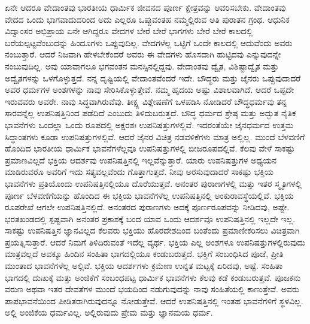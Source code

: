 ಏನೇ ಆದರೂ ವೇದಾಂತವು ಭಾರತೀಯ ಧಾರ್ಮಿಕ ಜೀವನದ ಪೂರ್ಣ ಕ್ಷೇತ್ರವನ್ನು ಆವರಿಸಬೇಕು. ವೇದಾಂತವು ವೇದದ ಒಂದು ಭಾಗವಾದುದರಿಂದ ಅದು ಎಲ್ಲರೂ ಒಪ್ಪುವಂತಹ ನಮ್ಮಲ್ಲಿರುವ ಅತಿ ಪುರಾತನ ಗ್ರಂಥ. ಆಧುನಿಕ ವಿದ್ವಾಂಸರ ಅಭಿಪ್ರಾಯ ಏನೇ ಆಗಿದ್ದರೂ ವೇದಗಳ ಬೇರೆ ಬೇರೆ ಭಾಗಗಳು ಬೇರೆ ಬೇರೆ ಕಾಲದಲ್ಲಿ ಬರೆಯಲ್ಪಟ್ಟವೆಂಬುದನ್ನು ಹಿಂದೂಗಳು ಒಪ್ಪುವುದಿಲ್ಲ. ವೇದಗಳೆಲ್ಲ ಒಟ್ಟಿಗೆ ಒಂದೇ ಕಾಲದಲ್ಲಿ ಆದುವೆಂದು ಅವರು ನಂಬುತ್ತಾರೆ. ಆದರೆ ನಿಜವಾಗಿ ಹೇಳಬೇಕೆಂದರೆ ಅವರು ಈ ವೇದಗಳು ಹೊಸದಾಗಿ ಹುಟ್ಟಿದವು ಎನ್ನುವುದನ್ನೇ ನಂಬುವುದಿಲ್ಲ. ಅವು ಯಾವಾಗಲೂ ಭಗವಂತನ ಮನಸ್ಸಿ\-ನಲ್ಲಿದ್ದವು. ವೇದಾಂತವು ದ್ವೈತ, ವಿಶಿಷ್ಟಾದ್ವೈತ ಮತ್ತು ಅದ್ವೈತಗಳನ್ನು ಒಳಗೊಳ್ಳುತ್ತದೆ. ನನ್ನ ದೃಷ್ಟಿಯಲ್ಲಿ ವೇದಾಂತವೆಂದರೆ ಇದೇ. ಬೌದ್ಧರು ಮತ್ತು ಜೈನರು ಒಪ್ಪುವುದಾದರೆ ಅವರ ಧರ್ಮಗಳ ಅಂಶಗಳನ್ನು ನಾವು ಸೇರಿಸಿಕೊಳ್ಳುತ್ತೇವೆ. ನಮ್ಮ ಹೃದಯ ಅಷ್ಟು ವಿಶಾಲವಾಗಿದೆ. ಆದರೆ ಒಪ್ಪದೇ ಇರುವವರು ಅವರೇ. ನಾವು ಸಿದ್ಧವಾಗಿರುವೆವು. ತೀಕ್ಷ್ಣ ವಿಶ್ಲೇಷಣೆಗೆ ಒಳಪಡಿಸಿ ನೋಡಿದರೆ ಬೌದ್ಧಧರ್ಮವು ತನ್ನ ಸಾರವನ್ನೆಲ್ಲ ಉಪನಿಷತ್ತಿನಿಂದ ಪಡೆದಿದೆ ಎಂಬುದು ತಿಳಿದುಬರುತ್ತದೆ. ಬೌದ್ಧ ಧರ್ಮದ ಶ್ರೇಷ್ಠ ಮತ್ತು ಅದ್ಭುತ ನೈತಿಕ ಭಾವನೆಗಳು ಒಂದಲ್ಲಾ ಒಂದು ರೂಪದಲ್ಲಿ ಅಕ್ಷರಶಃ ಉಪನಿಷತ್ತುಗಳಲ್ಲಿವೆ. ಇದರಂತೆಯೇ ಜೈನಧರ್ಮದ ಉತ್ತಮ ಸಿದ್ಧಾಂತಗಳು ಕೂಡಾ ಉಪನಿಷತ್ತುಗಳಲ್ಲಿವೆ. ಆದರೆ ಜೈನರ ವಿಚಿತ್ರ ನಡವಳಿಕೆಗಳು ಮಾತ್ರ ಅಲ್ಲಿಲ್ಲ. ಮುಂದೆ ಬೆಳವಣಿಗೆ ಹೊಂದಿದ ಭಾರತೀಯ ಧಾರ್ಮಿಕ ಭಾವನೆಗಳೆಲ್ಲವೂ ಉಪನಿಷತ್ತುಗಳಲ್ಲಿ ಬೀಜರೂಪದಲ್ಲಿವೆ. ಕೆಲವು ವೇಳೆ ಸಾಕಷ್ಟು ಪ್ರಮಾಣವಿಲ್ಲದೆ ಭಕ್ತಿಯ ಆದರ್ಶವು ಉಪನಿಷತ್ತಿನಲ್ಲಿ ಇಲ್ಲವೆನ್ನುತ್ತಾರೆ. ಯಾರು ಉಪನಿಷತ್ತುಗಳ ಅಧ್ಯಯನ ಮಾಡಿರುವರೊ ಅವರಿಗೆ ಇದು ಸತ್ಯವಲ್ಲವೆಂದು ಗೊತ್ತಾಗುತ್ತದೆ. ನೀವು ಅರಸು\-ವುದಾದರೆ ಸಾಕಷ್ಟು ಭಕ್ತಿಯ ಭಾವನೆಗಳು ಪ್ರತಿಯೊಂದು ಉಪನಿಷತ್ತಿನಲ್ಲಿಯೂ ದೊರೆಯುತ್ತವೆ. ಅನಂತರ ಪುರಾಣಗಳಲ್ಲಿ ಮತ್ತು ಇತರ ಸ್ಮೃತಿಗಳಲ್ಲಿ ಪೂರ್ಣ ಬೆಳವಣಿಗೆಯನ್ನು ಹೊಂದಿದ ಈ ಭಕ್ತಿಯ ಭಾವನೆಗಳೆಲ್ಲ ಉಪನಿಷತ್ತಿನಲ್ಲಿ ಅಂಕುರಾವಸ್ಥೆಯಲ್ಲಿವೆ. ಭಕ್ತಿಯ ರೂಪರೇಖೆ ಆಗಲೇ ಉಪನಿಷತ್ತಿನಲ್ಲಿದೆ. ಅನಂತರದ ಪುರಾಣಗಳು ಅದಕ್ಕೆ ಪೂರ್ಣರೂಪವನ್ನು ನೀಡಿದವು, ಅಷ್ಟೇ. ಭರತಖಂಡದಲ್ಲಿ ಸ್ಪಷ್ಟವಾಗಿ ಅನಂತರ ಪ್ರಕಾಶಕ್ಕೆ ಬಂದ ಯಾವ ಒಂದು ಆದರ್ಶವೂ ಉಪನಿಷತ್ತಿನಲ್ಲಿ ಇಲ್ಲದೇ ಇಲ್ಲ. ಸಾಕಷ್ಟು ಉಪನಿಷತ್ತಿನ ಜ್ಞಾನವಿಲ್ಲದ ಕೆಲವರು ಭಕ್ತಿಯು ಹೊರದೇಶದಿಂದ ಬಂತೆಂದು ಪ್ರಮಾಣೀಕರಿಸಲು ವಿಚಿತ್ರವಾಗಿ ಪ್ರಯತ್ನಿಸುತ್ತಾರೆ. ಆದರೆ ನಿಮಗೆ ತಿಳಿದಿರುವಂತೆ ಇದೆಲ್ಲ ವ್ಯರ್ಥ. ಭಕ್ತಿಯ ಎಲ್ಲ ಅಂಶಗಳೂ ಉಪನಿಷತ್ತುಗಳಲ್ಲಿರುವುದು ಮಾತ್ರವಲ್ಲದೆ ಅವಕ್ಕೂ ಹಿಂದಿನ ಸಂಹಿತಾ ಭಾಗದಲ್ಲಿಯೂ ಕಂಡುಬರುತ್ತದೆ. ಭಕ್ತಿಗೆ ಸಂಬಂಧಿಸಿದ ಪೂಜೆ, ಪ್ರೀತಿ ಮುಂತಾದ ಭಾವನೆಗಳೆಲ್ಲ ಅಲ್ಲಿವೆ. ಭಕ್ತಿಯ ಆದರ್ಶಗಳು ಕ್ರಮೇಣ ಉನ್ನತ ಮಟ್ಟಕ್ಕೆ ಏರಿದವು, ಅಷ್ಟೆ. ಸಂಹಿತಾ ಭಾಗದಲ್ಲಿ ದುಃಖಕ್ಕೆ ಮತ್ತು ಅಂಜಿಕೆಗೆ ಸಂಬಂಧಪಟ್ಟ ಧಾರ್ಮಿಕ ಭಾವನೆಗಳು ಕೆಲವು ಕಡೆ ಕಂಡುಬರುತ್ತವೆ. ಪೂಜಕನು ವರುಣ ಅಥವಾ ಇತರ ದೇವತೆಗಳ ಮುಂದೆ ಭಯದಿಂದ ನಡುಗುವುದನ್ನು ನಾವು ಸಂಹಿತೆಯಲ್ಲಿ ಕಾಣುತ್ತೇವೆ. ಅವರು ಪಾಪಭಾವನೆಯಿಂದ ಪೀಡಿತರಾಗಿರುವುದನ್ನೂ ನೋಡುತ್ತೇವೆ. ಆದರೆ ಉಪನಿಷತ್ತಿನಲ್ಲಿ ಇಂತಹ ಭಾವನೆಗಳಿಗೆ ಸ್ಥಳವಿಲ್ಲ. ಅಲ್ಲಿ ಅಂಜಿಕೆಯ ಧರ್ಮವಿಲ್ಲ. ಅಲ್ಲಿರುವುದು ಪ್ರೇಮ ಮತ್ತು ಜ್ಞಾನಮಯ ಧರ್ಮ.

